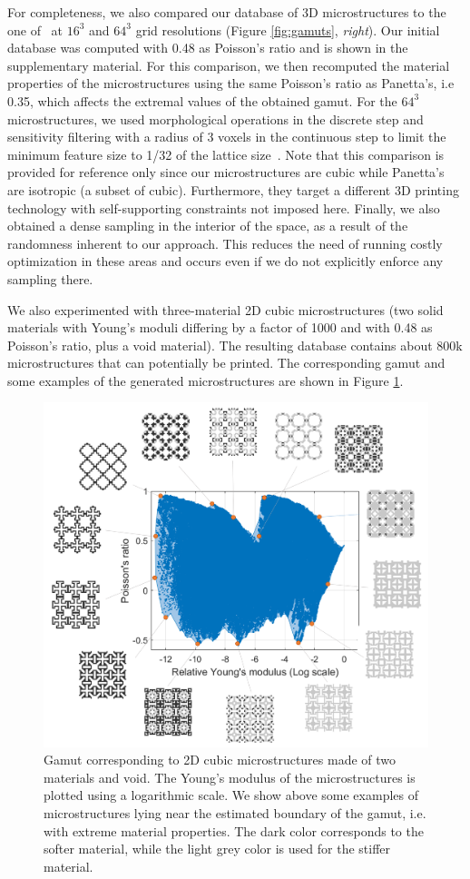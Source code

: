 For completeness, we also compared our database of 3D microstructures to the one of~\citet{Panetta:2015} at $16^3$ and $64^3$ grid resolutions (Figure \ref{fig:gamuts}, \emph{right}). Our initial database was computed with 0.48 as Poisson's ratio and is shown in the supplementary material. For this comparison, we then recomputed the material properties of the microstructures using the same Poisson's ratio as Panetta's, i.e 0.35, which affects the extremal values of the obtained gamut.
For the $64^3$ microstructures, we used morphological operations in the discrete step and sensitivity filtering with a radius of 3 voxels in the continuous step to limit the minimum feature size to 1/32 of the lattice size~\citep{sigmund:2007}. Note that this comparison is provided for reference only since our microstructures are cubic while Panetta's are isotropic (a subset of cubic). Furthermore, they target a different 3D printing technology with self-supporting constraints not imposed here.
Finally, we also obtained a dense sampling in the interior of the space, as a result of the randomness inherent to our approach. This reduces the need of running costly optimization in these areas and occurs even if we do not explicitly enforce any sampling there.

We also experimented with three-material 2D cubic microstructures (two solid materials with Young's moduli differing by a factor of 1000 and with 0.48 as Poisson's ratio, plus a void material). The resulting database contains about 800k microstructures that can potentially be printed. The corresponding gamut and some examples of the generated microstructures are shown in Figure \ref{fig:Cubic2D_3Materials}.
\begin{figure}
	\centering
	\includegraphics[width=.5\linewidth]{images/Cubic2D_3Materials.png}
	\caption{Gamut corresponding to 2D cubic microstructures made of two materials and void. The Young's modulus of the microstructures is plotted using a logarithmic scale. We show above some examples of microstructures lying near the estimated boundary of the gamut, i.e. with extreme material properties. The dark color corresponds to the softer material, while the light grey color is used for the stiffer material.}
	\label{fig:Cubic2D_3Materials}
\end{figure}
